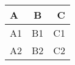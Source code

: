 \begin{tabular}{l||c|r}
\hline
A & B & C \\
\hline
A1 & B1 & C1\\
\cline{2-3}
A2 & B2 & C2 \\


\end{tabular}
